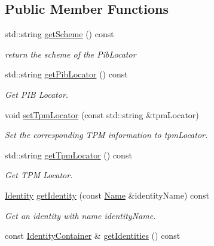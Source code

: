 \subsection*{Public Member Functions}
\begin{DoxyCompactItemize}
\item 
std\+::string \hyperlink{classndn_1_1security_1_1Pib_a4895a06cbc5688c7aeafc4ed82027b50}{get\+Scheme} () const\hypertarget{classndn_1_1security_1_1Pib_a4895a06cbc5688c7aeafc4ed82027b50}{}\label{classndn_1_1security_1_1Pib_a4895a06cbc5688c7aeafc4ed82027b50}

\begin{DoxyCompactList}\small\item\em return the scheme of the Pib\+Locator \end{DoxyCompactList}\item 
std\+::string \hyperlink{classndn_1_1security_1_1Pib_abe11c7b1d702a95840df0f73e4a6d4fc}{get\+Pib\+Locator} () const\hypertarget{classndn_1_1security_1_1Pib_abe11c7b1d702a95840df0f73e4a6d4fc}{}\label{classndn_1_1security_1_1Pib_abe11c7b1d702a95840df0f73e4a6d4fc}

\begin{DoxyCompactList}\small\item\em Get P\+IB Locator. \end{DoxyCompactList}\item 
void \hyperlink{classndn_1_1security_1_1Pib_ae4b5f4a9470d99d262e221723f8cae08}{set\+Tpm\+Locator} (const std\+::string \&tpm\+Locator)
\begin{DoxyCompactList}\small\item\em Set the corresponding T\+PM information to {\ttfamily tpm\+Locator}. \end{DoxyCompactList}\item 
std\+::string \hyperlink{classndn_1_1security_1_1Pib_aa5d224e4849e839d98b5dee73f42931e}{get\+Tpm\+Locator} () const\hypertarget{classndn_1_1security_1_1Pib_aa5d224e4849e839d98b5dee73f42931e}{}\label{classndn_1_1security_1_1Pib_aa5d224e4849e839d98b5dee73f42931e}

\begin{DoxyCompactList}\small\item\em Get T\+PM Locator. \end{DoxyCompactList}\item 
\hyperlink{classndn_1_1security_1_1Identity}{Identity} \hyperlink{classndn_1_1security_1_1Pib_a4b202f6abfb3eb138ccd0d04e39b5d00}{get\+Identity} (const \hyperlink{classndn_1_1Name}{Name} \&identity\+Name) const
\begin{DoxyCompactList}\small\item\em Get an identity with name {\ttfamily identity\+Name}. \end{DoxyCompactList}\item 
const \hyperlink{classndn_1_1security_1_1IdentityContainer}{Identity\+Container} \& \hyperlink{classndn_1_1security_1_1Pib_ae7a92a75db937caebf0132ddfb26d769}{get\+Identities} () const\hypertarget{classndn_1_1security_1_1Pib_ae7a92a75db937caebf0132ddfb26d769}{}\label{classndn_1_1security_1_1Pib_ae7a92a75db937caebf0132ddfb26d769}


\end{DoxyCompactItemize}
